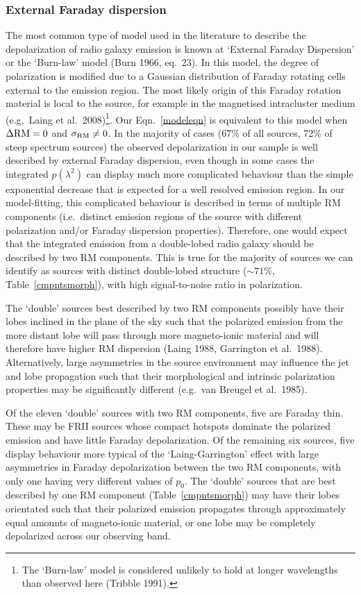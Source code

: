 \documentclass{mnras}
\newcommand*\sigmaRM{\sigma_{\rm RM}}
\newcommand*\DeltaRM{\Delta{\rm RM}}
\begin{document}
\subsubsection{External Faraday dispersion}
The most common type of model used in the literature to describe the depolarization of radio galaxy emission is known at `External Faraday Dispersion' or the `Burn-law' model (Burn 1966, eq.~23). In this model, the degree of polarization is modified due to a Gaussian distribution of Faraday rotating cells external to the emission region. The most likely origin of this Faraday rotation material is local to the source, for example in the magnetised intracluster medium (e.g.~Laing et al.~2008)\footnote{The `Burn-law' model is considered unlikely to hold at longer wavelengths than observed here (Tribble 1991).}. 
Our Eqn.~\ref{modeleqn} is equivalent to this model when $\DeltaRM=0$ and $\sigmaRM\ne0$. In the majority of cases (67\% of all sources, 72\% of steep spectrum sources) the observed depolarization in our sample is well described by external Faraday dispersion, even though in some cases the integrated $p(\lambda^2)$ can display much more complicated behaviour than the simple exponential decrease that is expected for a well resolved emission region. In our model-fitting, this complicated behaviour is described in terms of multiple RM components (i.e.~distinct emission regions of the source with different polarization and/or Faraday dispersion properties). Therefore, one would expect that the integrated emission from a double-lobed radio galaxy should be described by two RM components. This is true for the majority of sources we can identify as sources with distinct double-lobed structure ($\sim$$71\%$, Table~\ref{cmpntsmorph}), with high signal-to-noise ratio in polarization. 

The `double' sources best described by two RM components possibly have their lobes inclined in the plane of the sky such that the polarized emission from the more distant lobe will pass through more magneto-ionic material and will therefore have higher RM dispersion (Laing 1988, Garrington et al.~1988). Alternatively, large asymmetries in the source environment may influence the jet and lobe propagation such that their morphological and intrinsic polarization properties may be significantly different (e.g.~van Breugel et al.~1985).

Of the eleven `double' sources with two RM components, five are Faraday thin. These may be FRII sources whose compact hotspots dominate the polarized emission and have little Faraday depolarization. Of the remaining six sources, five display behaviour more typical of the `Laing-Garrington' effect with large asymmetries in Faraday depolarization between the two RM components, with only one having very different values of $p_0$. 
The `double' sources that are best described by one RM component (Table~\ref{cmpntsmorph}) may have their lobes orientated such that their polarized emission propagates through approximately equal amounts of magneto-ionic material, or one lobe may be completely depolarized across our observing band. 
\end{document}

